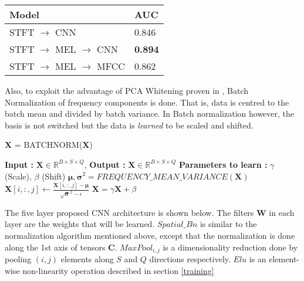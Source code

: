     \begin{tabular}{ | p{5cm} | l |}
    \hline
    \textbf{Model} & \textbf{AUC} \\ \hline
    STFT $\rightarrow$ CNN &  0.846\\ \hline
    STFT $\rightarrow$ MEL $\rightarrow$ CNN &  \textbf{0.894}\\ \hline
    STFT $\rightarrow$ MEL $\rightarrow$ MFCC &  0.862 \\ \hline
    \hline
    \end{tabular}
    
\noindent Also, to exploit the advantage of PCA Whitening proven in \cite{MultiScale}\cite{featurelearn1}, Batch Normalization of frequency components is done. That is, data is centred to the batch mean and divided by batch variance. In Batch normalization however, the basis is not switched but the data is \textit{learned} to be scaled and shifted.
\begin{algorithm}
  \caption{$\textbf{\^{X}}$ = BATCHNORM($\textbf{X}$) }\label{Batch norm}
  \begin{algorithmic}[1]
    \Statex \textbf{Input :} $\textbf{X} \in \mathbb{R}^{B \times S \times Q}$, 
    \Statex \textbf{Output :} $\textbf{\^X} \in \mathbb{R}^{B \times S \times Q}$ 
    \Statex \textbf{Parameters to learn :} $\gamma$ (Scale), $\beta$ (Shift) 
    \State $\bm{\mu}, \bm{\sigma}^{2} = FREQUENCY\_MEAN\_VARIANCE(\textbf{X})$ 
       \State $\textbf{X}[i,:,j] \leftarrow \frac{\textbf{X}[i,:,j] - \bm{\mu}}{\sqrt{\bm{\sigma}}^{2} - \epsilon}$
      \EndFor
     \EndFor
     \State $\textbf{\^X} = \gamma\textbf{X} + \beta$
  \end{algorithmic}
\end{algorithm}
\FloatBarrier

\noindent The five layer proposed CNN architecture is shown below. The filters $\textbf{W}$ in each layer are the weights that will be learned. $Spatial\_Bn$ is similar to the normalization algorithm mentioned above, except that the normalization is done along the 1st axis of tensors $\textbf{C}$. $MaxPool_{i,j}$ is a dimensionality reduction done by pooling $(i,j)$ elements along $S$ and $Q$ directions respectively. $Elu$ is an element-wise non-linearity operation described in section \ref{training} 

